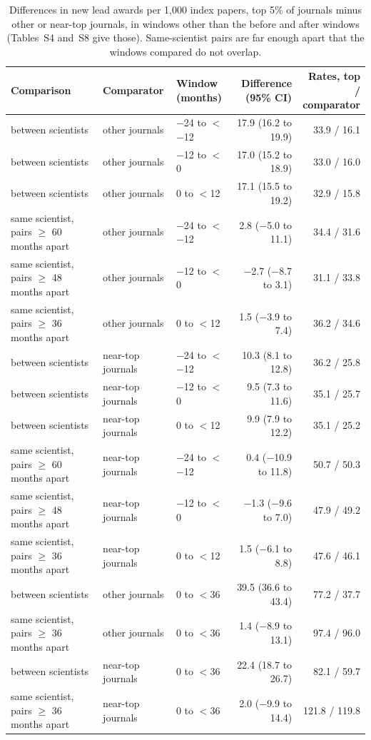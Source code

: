 \begin{table}[H]
\centering\small
\caption{Differences in new lead awards per 1,000 index papers, top 5\% of journals minus other or near-top journals, in windows other than the before and after windows (Tables~S4 and~S8 give those). Same-scientist pairs are far enough apart that the windows compared do not overlap.}\label{tab:s_timing}
\footnotesize
\begin{tabularx}{\linewidth}{>{\raggedright\arraybackslash}Xllrr}
\toprule
Comparison & Comparator & \makecell[lb]{Window\\(months)} & \makecell[rb]{Difference\\(95\% CI)} & \makecell[rb]{Rates, top /\\comparator} \\
\midrule
between scientists & other journals & $-$24 to $<$$-$12 & 17.9 (16.2 to 19.9) & 33.9 / 16.1 \\
between scientists & other journals & $-$12 to $<$0 & 17.0 (15.2 to 18.9) & 33.0 / 16.0 \\
between scientists & other journals & 0 to $<$12 & 17.1 (15.5 to 19.2) & 32.9 / 15.8 \\
same scientist, pairs $\geq$ 60 months apart & other journals & $-$24 to $<$$-$12 & 2.8 ($-$5.0 to 11.1) & 34.4 / 31.6 \\
same scientist, pairs $\geq$ 48 months apart & other journals & $-$12 to $<$0 & $-$2.7 ($-$8.7 to 3.1) & 31.1 / 33.8 \\
same scientist, pairs $\geq$ 36 months apart & other journals & 0 to $<$12 & 1.5 ($-$3.9 to 7.4) & 36.2 / 34.6 \\
between scientists & near-top journals & $-$24 to $<$$-$12 & 10.3 (8.1 to 12.8) & 36.2 / 25.8 \\
between scientists & near-top journals & $-$12 to $<$0 & 9.5 (7.3 to 11.6) & 35.1 / 25.7 \\
between scientists & near-top journals & 0 to $<$12 & 9.9 (7.9 to 12.2) & 35.1 / 25.2 \\
same scientist, pairs $\geq$ 60 months apart & near-top journals & $-$24 to $<$$-$12 & 0.4 ($-$10.9 to 11.8) & 50.7 / 50.3 \\
same scientist, pairs $\geq$ 48 months apart & near-top journals & $-$12 to $<$0 & $-$1.3 ($-$9.6 to 7.0) & 47.9 / 49.2 \\
same scientist, pairs $\geq$ 36 months apart & near-top journals & 0 to $<$12 & 1.5 ($-$6.1 to 8.8) & 47.6 / 46.1 \\
between scientists & other journals & 0 to $<$36 & 39.5 (36.6 to 43.4) & 77.2 / 37.7 \\
same scientist, pairs $\geq$ 36 months apart & other journals & 0 to $<$36 & 1.4 ($-$8.9 to 13.1) & 97.4 / 96.0 \\
between scientists & near-top journals & 0 to $<$36 & 22.4 (18.7 to 26.7) & 82.1 / 59.7 \\
same scientist, pairs $\geq$ 36 months apart & near-top journals & 0 to $<$36 & 2.0 ($-$9.9 to 14.4) & 121.8 / 119.8 \\
\bottomrule
\end{tabularx}
\end{table}


